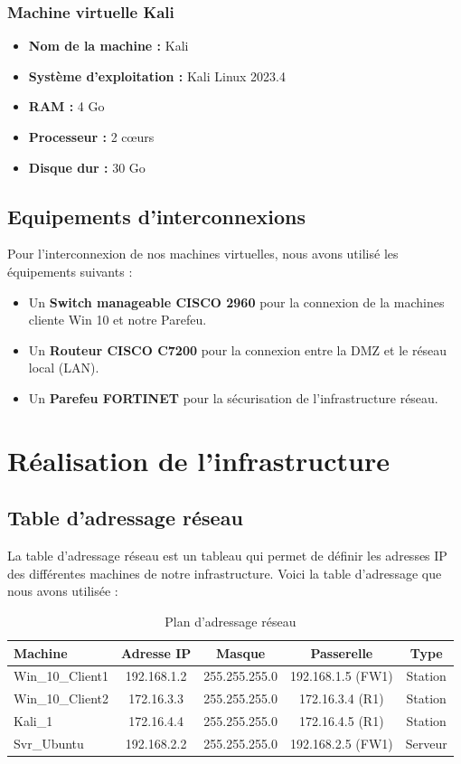 \documentclass[12pt, a4paper]{article}
\begin{document}
\subsubsection{Machine virtuelle Kali}
\begin{itemize}
	\item \textbf{Nom de la machine :} Kali
	\item \textbf{Système d'exploitation :} Kali Linux 2023.4
	\item \textbf{RAM :} 4 Go
	\item \textbf{Processeur :} 2 cœurs
	\item \textbf{Disque dur :} 30 Go
\end{itemize}
\subsection{Equipements d'interconnexions}
Pour l'interconnexion de nos machines virtuelles, nous avons utilisé les
équipements suivants :
\begin{itemize}
	\item Un \textbf{Switch manageable CISCO 2960} pour la connexion de la machines
	      cliente Win 10 et notre Parefeu.
	\item Un \textbf{Routeur CISCO C7200} pour la connexion entre la DMZ et le réseau
	      local (LAN).
	\item Un \textbf{Parefeu FORTINET} pour la sécurisation de l'infrastructure réseau.
\end{itemize}
\section{Réalisation de l'infrastructure}
\subsection{Table d'adressage réseau}
La table d'adressage réseau est un tableau qui permet de définir les adresses
IP des différentes machines de notre infrastructure. Voici la table d'adressage
que nous avons utilisée :
\begin{table}[h!]
	\centering
	\renewcommand{\arraystretch}{1.3} %
	\caption{Plan d'adressage réseau}
	\begin{tabular}{|l|c|c|c|c|}
		\hline
		\textbf{Machine} & \textbf{Adresse IP} & \textbf{Masque} & \textbf{Passerelle} & \textbf{Type} \\
		\hline
		Win\_10\_Client1 & 192.168.1.2         & 255.255.255.0   & 192.168.1.5 (FW1)   & Station       \\
		\hline
		Win\_10\_Client2 & 172.16.3.3          & 255.255.255.0   & 172.16.3.4 (R1)     & Station       \\
		\hline
		Kali\_1          & 172.16.4.4          & 255.255.255.0   & 172.16.4.5 (R1)     & Station       \\
		\hline
		Svr\_Ubuntu      & 192.168.2.2         & 255.255.255.0   & 192.168.2.5 (FW1)   & Serveur       \\
		\hline
	\end{tabular}
\end{table}
\end{document}
